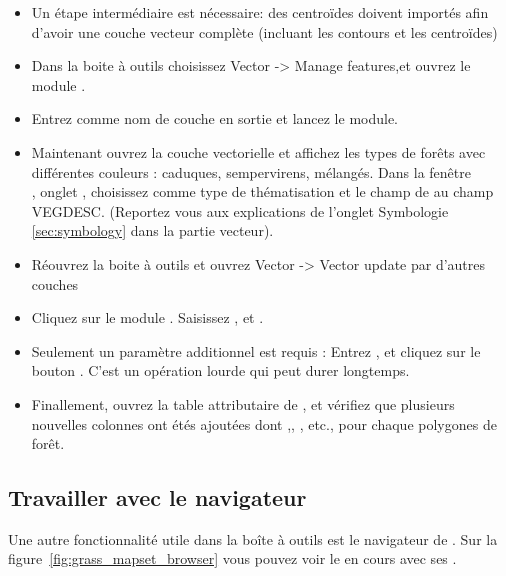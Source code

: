 {\begin{itemize}[label=--]
\item Un étape intermédiaire est nécessaire: des centroïdes doivent importés afin d'avoir une couche \grass vecteur complète (incluant les contours et les centroïdes)
\item Dans la boite à outils choisissez Vector -> Manage features,et ouvrez le module .
\item Entrez comme nom de couche en sortie  et lancez le module.
\item Maintenant ouvrez la couche vectorielle  et affichez les types de forêts avec différentes couleurs : caduques, sempervirens, mélangés. Dans la fenêtre\\ , onglet  , choisissez  comme type de thématisation et le champ de  au champ VEGDESC. (Reportez vous aux explications de l'onglet Symbologie \ref{sec:symbology} dans la partie vecteur).
\item Réouvrez la boite à outils \grass et ouvrez Vector -> Vector update par d'autres couches
\item Cliquez sur le module . Saisissez , et .
\item Seulement un paramètre additionnel est requis : Entrez  , et cliquez sur le bouton . C'est un opération lourde qui peut durer longtemps.
\item Finallement, ouvrez la table attributaire de , et vérifiez que plusieurs nouvelles colonnes ont étés ajoutées dont ,, , etc., pour chaque polygones de forêt.
\end{itemize}

\subsection{Travailler avec le navigateur \grass} 

Une autre fonctionnalité utile dans la boîte à outils \grass est le navigateur de  \grass. Sur la figure~\ref{fig:grass_mapset_browser} vous pouvez voir le  en cours  avec ses .

}
